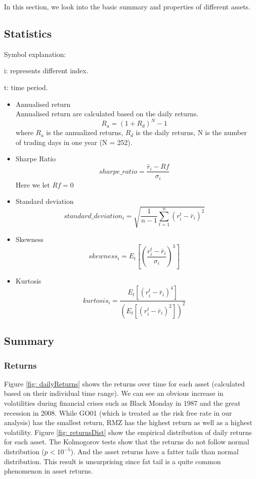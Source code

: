 In this section, we look into the basic summary and properties of different assets.

\subsection{Statistics}
Symbol explanation:

i: represents different index.

t: time period.

\begin{itemize}
\item Annualised return \\
Annualised return are calculated based on the daily returns. 
\begin{equation}
R_a = (1+R_d)^{N} -1
\end{equation}
where $R_a$ is the annualized returns, $R_d$ is the daily returns, N is the number of trading days in one year (N = 252).
\item Sharpe Ratio
\begin{equation}
sharpe\_ratio = \frac{\bar{r}_i-Rf}{\sigma_i}
\end{equation}
Here we let $Rf = 0$
\item Standard deviation
\begin{equation}
standard\_deviation_i =\sqrt{ \frac{1}{n-1}\sum_{t=1}^n{(r_i^t-\bar{r}_i)^2}} 
\end{equation}
\item Skewness
\begin{equation}
skewness_i = E_t \left[ \left( \frac{r_i^t-\bar{r}_i}{\sigma_i} \right)^3 \right]
\end{equation}
\item Kurtosis
\begin{equation}
kurtosis_i = \frac{E_t \left[ \left( r_i^t-\bar{r}_i \right)^4 \right]}{\left(E_t \left[ \left( r_i^t-\bar{r}_i \right)^2 \right]\right)^2}
\end{equation}
\end{itemize}

\subsection{Summary}

\subsubsection{Returns}

Figure \ref{fig: dailyReturns} shows the returns over time for each asset (calculated based on their individual time range). We can see an obvious increase in volatilities during financial crises such as Black Monday in 1987 and the great recession in 2008. While GO01 (which is treated as the risk free rate in our analysis) has the smallest return, RMZ has the highest return as well as a highest volatility. Figure \ref{fig: returnsDist} show the empirical distribution of daily returns for each asset. The Kolmogorov tests show that the returns do not follow normal distribution ($p < 10^{-5}$). And the asset returns have a fatter tails than normal distribution. This result is unsurprising since fat tail is a quite common phenomenon in asset returns. 

